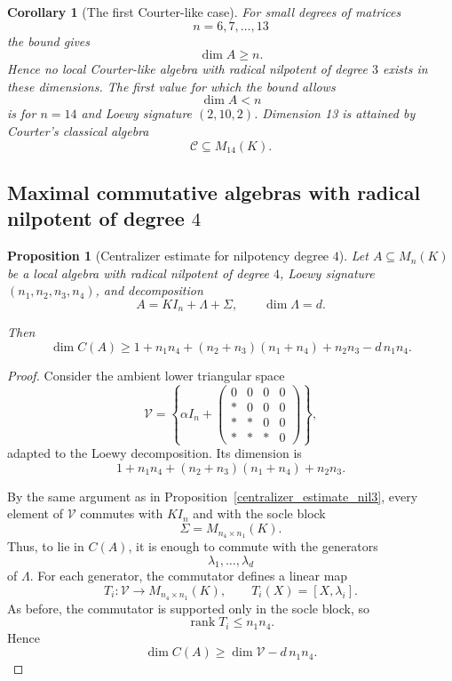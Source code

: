 \documentclass[11pt]{article}
\theoremstyle{remark}
\theoremstyle{plain}
\newtheorem{proposition}[theorem]{Proposition}
\newtheorem{corollary}[theorem]{Corollary}
\theoremstyle{definition}
\theoremstyle{myremark}
\begin{document}
\begin{corollary}[The first Courter-like case]
	\label{first_case}
	For small degrees of matrices
	\[	n=6,7,\ldots,13	\]
	the bound gives
	\[	\dim A	\ge	n.	\]	
	Hence no local Courter-like algebra with radical nilpotent of degree \(3\)
	exists in these dimensions.	
	The first value for which the bound allows
	\[	\dim A<n\]	is	for $n=14$ and Loewy signature $(2,10,2)$.
	Dimension 13 is attained by Courter's classical algebra
	\[	\mathcal C\subseteq M_{14}(K).	\]
\end{corollary}



	
	
\subsection{Maximal commutative algebras with radical nilpotent of degree \(4\)}

\begin{proposition}[Centralizer estimate for nilpotency degree \(4\)]
	\label{centralizer_estimate_nil4}
	Let \(A\subseteq M_n(K)\) be a local algebra with radical nilpotent of
	degree \(4\), Loewy signature \((n_1,n_2,n_3,n_4)\), and decomposition
	\[
	A=KI_n+\Lambda+\Sigma,
	\qquad
	\dim\Lambda=d.
	\]
	
	Then
	\[
	\dim C(A)
	\ge
	1+n_1n_4+(n_2+n_3)(n_1+n_4)+n_2n_3-d\,n_1n_4.
	\]
\end{proposition}

\begin{proof}
	Consider the ambient lower triangular space
	\[
	\mathcal V=
	\left\{
	\alpha I_n+
	\begin{pmatrix}
		0&0&0&0\\
		*&0&0&0\\
		*&*&0&0\\
		*&*&*&0
	\end{pmatrix}
	\right\},
	\]
	adapted to the Loewy decomposition. Its dimension is
	\[
	1+n_1n_4+(n_2+n_3)(n_1+n_4)+n_2n_3.
	\]
	
	By the same argument as in Proposition~\ref{centralizer_estimate_nil3},
	every element of \(\mathcal V\) commutes with \(KI_n\) and with the socle
	block
	\[
	\Sigma=M_{n_4\times n_1}(K).
	\]
	Thus, to lie in \(C(A)\), it is enough to commute with the generators
	\[
	\lambda_1,\dots,\lambda_d
	\]
	of \(\Lambda\).	
	For each generator, the commutator defines a linear map
	\[
	T_i:\mathcal V\to M_{n_4\times n_1}(K),
	\qquad
	T_i(X)=[X,\lambda_i].
	\]
	As before, the commutator is supported only in the socle block, so
	\[
	\operatorname{rank}T_i\le n_1n_4.
	\]
	Hence
	\[
	\dim C(A)\ge \dim\mathcal V-d\,n_1n_4.
	\]
\end{proof}
\end{document}
